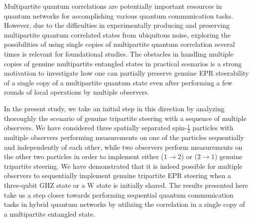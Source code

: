 \documentclass[pra,a4paper,aps,twocolumn,showpacs,superscriptaddress,groupedaddress]{revtex4}
\begin{document}
Multipartite quantum correlations are potentially important resources in  quantum networks for accomplishing various quantum communication  tasks. However, due to the difficulties in experimentally producing and preserving  multipartite quantum correlated states from ubiquitous noise, exploring the possibilities of using single copies of multipartite quantum correlation several times is  relevant for  foundational studies. The obstacles in handling multiple copies of  genuine multipartite entangled states in practical scenarios is a strong motivation to investigate how one can partially preserve genuine  EPR steerability of a single copy of a multipartite quantum state even after performing a few rounds of local operations by multiple observers. %

In the present study, we take an initial step in this direction by analyzing thoroughly the scenario of genuine tripartite steering with a sequence of multiple observers. We have considered  three spatially separated spin-$\frac{1}{2}$ particles with multiple observers performing measurements  on one of the particles sequentially and independently of each other, while two  observers perform measurements on  the other two particles in order to implement either ($1 \rightarrow 2$) or ($2 \rightarrow 1$) genuine tripartite steering. We have demonstrated that it is indeed possible for multiple observers to sequentially implement genuine tripartite EPR steering when a three-qubit GHZ state or a W state is initially shared. The results presented here take us a step closer towards performing sequential quantum communication tasks in hybrid quantum networks by utilizing the correlation in a single copy of a multipartite entangled state.
\end{document}
